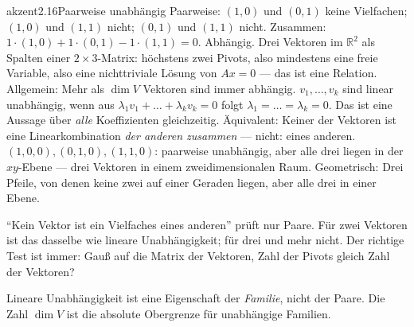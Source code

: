 \begin{loesungkarte}{akzent}{2.16}{Paarweise unabhängig}
Paarweise: $(1, 0)$ und $(0, 1)$ keine Vielfachen; $(1, 0)$ und $(1, 1)$ nicht; $(0, 1)$ und $(1, 1)$ nicht. Zusammen: $1\cdot(1, 0) + 1\cdot(0, 1) - 1\cdot(1, 1) = 0$. Abhängig.
Drei Vektoren im $\mathbb R^{2}$ als Spalten einer $2\times3$-Matrix: höchstens zwei Pivots, also mindestens eine freie Variable, also eine nichttriviale Lösung von $Ax = 0$ --- das ist eine Relation. Allgemein: Mehr als $\dim V$ Vektoren sind immer abhängig.
$v_1, \dots, v_k$ sind linear unabhängig, wenn aus $\lambda_1v_1 + \dots + \lambda_kv_k = 0$ folgt $\lambda_1 = \dots = \lambda_k = 0$. Das ist eine Aussage über \emph{alle} Koeffizienten gleichzeitig. Äquivalent: Keiner der Vektoren ist eine Linearkombination \emph{der anderen zusammen} --- nicht: eines anderen.
$(1, 0, 0), (0, 1, 0), (1, 1, 0)$: paarweise unabhängig, aber alle drei liegen in der $xy$-Ebene --- drei Vektoren in einem zweidimensionalen Raum. Geometrisch: Drei Pfeile, von denen keine zwei auf einer Geraden liegen, aber alle drei in einer Ebene.
\begin{fehler}\kastentext
\enquote{Kein Vektor ist ein Vielfaches eines anderen} prüft nur Paare. Für zwei Vektoren ist das dasselbe wie lineare Unabhängigkeit; für drei und mehr nicht. Der richtige Test ist immer: Gauß auf die Matrix der Vektoren, Zahl der Pivots gleich Zahl der Vektoren?
\end{fehler}
\begin{mitnehmen}\kastentext
Lineare Unabhängigkeit ist eine Eigenschaft der \emph{Familie}, nicht der Paare. Die Zahl $\dim V$ ist die absolute Obergrenze für unabhängige Familien.
\end{mitnehmen}
\end{loesungkarte}

